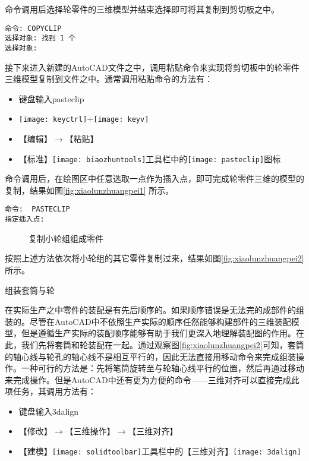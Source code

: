 \begin{procedure}
命令调用后选择轮零件的三维模型并结束选择即可将其复制到剪切板之中。
\begin{lstlisting}
命令: COPYCLIP
选择对象: 找到 1 个
选择对象:
\end{lstlisting}

接下来进入新建的AutoCAD文件之中，调用粘贴命令来实现将剪切板中的轮零件三维模型复制到文件之中。通常调用粘贴命令的方法有：
\begin{itemize}
\item 键盘输入pasteclip
\item \texttt{[image: keyctrl]}+\texttt{[image: keyv]}
\item 【编辑】$\rightarrow $【粘贴】
\item 【标准】\texttt{[image: biaozhuntools]}工具栏中的\texttt{[image: pasteclip]}图标
\end{itemize}

命令调用后，在绘图区中任意选取一点作为插入点，即可完成轮零件三维的模型的复制，结果如图\ref{fig:xiaolunzhuangpei1} 所示。
\begin{lstlisting}
命令:  PASTECLIP
指定插入点:
\end{lstlisting}


\begin{figure}[htbp]
\centering
{}\hspace{20pt}
\caption{复制小轮组组成零件}
\end{figure}

按照上述方法依次将小轮组的其它零件复制过来，结果如图\ref{fig:xiaolunzhuangpei2}所示。
\item 组装套筒与轮

在实际生产之中零件的装配是有先后顺序的。如果顺序错误是无法完的成部件的组装的。尽管在AutoCAD中不依照生产实际的顺序任然能够构建部件的三维装配模型，但是遵循生产实际的装配顺序能够有助于我们更深入地理解装配图的作用。在此，我们先将套筒和轮装配在一起。通过观察图\ref{fig:xiaolunzhuangpei2}可知，套筒的轴心线与轮孔的轴心线不是相互平行的，因此无法直接用移动命令来完成组装操作。一种可行的方法是：先将笔筒旋转至与轮轴心线平行的位置，然后再通过移动来完成操作。但是AutoCAD中还有更为方便的命令——三维对齐可以直接完成此项任务，其调用方法有：
\begin{itemize}
\item 键盘输入3dalign
\item 【修改】$\rightarrow $【三维操作】$\rightarrow $【三维对齐】
\item 【建模】\texttt{[image: solidtoolbar]}工具栏中的【三维对齐】\texttt{[image: 3dalign]}
\end{itemize}


\end{procedure}
